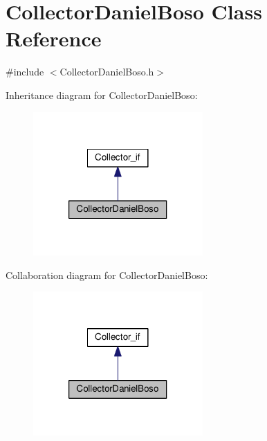 \hypertarget{class_collector_daniel_boso}{\section{Collector\-Daniel\-Boso Class Reference}
\label{class_collector_daniel_boso}
}


{\ttfamily \#include $<$Collector\-Daniel\-Boso.\-h$>$}



Inheritance diagram for Collector\-Daniel\-Boso\-:
\nopagebreak
\begin{figure}[H]
\begin{center}
\leavevmode
\includegraphics[width=184pt]{class_collector_daniel_boso__inherit__graph}
\end{center}
\end{figure}


Collaboration diagram for Collector\-Daniel\-Boso\-:
\nopagebreak
\begin{figure}[H]
\begin{center}
\leavevmode
\includegraphics[width=184pt]{class_collector_daniel_boso__coll__graph}
\end{center}
\end{figure}
